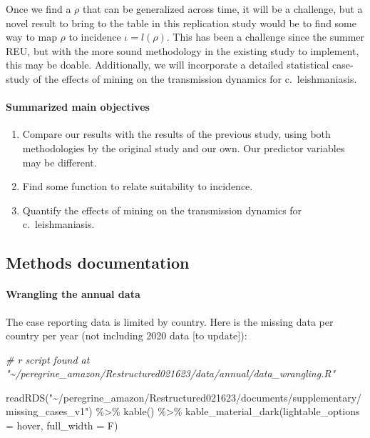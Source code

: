\documentclass[
]{article}
\newenvironment{Shaded}{\begin{snugshade}}{\end{snugshade}}
\newcommand{\AttributeTok}[1]{\textcolor[rgb]{0.77,0.63,0.00}{#1}}
\newcommand{\CommentTok}[1]{\textcolor[rgb]{0.56,0.35,0.01}{\textit{#1}}}
\newcommand{\FunctionTok}[1]{\textcolor[rgb]{0.00,0.00,0.00}{#1}}
\newcommand{\NormalTok}[1]{#1}
\newcommand{\SpecialCharTok}[1]{\textcolor[rgb]{0.00,0.00,0.00}{#1}}
\newcommand{\StringTok}[1]{\textcolor[rgb]{0.31,0.60,0.02}{#1}}
\begin{document}
Once we find a \(\rho\) that can be generalized across time, it will be
a challenge, but a novel result to bring to the table in this
replication study would be to find some way to map \(\rho\) to incidence
\(\iota = l(\rho)\). This has been a challenge since the summer REU, but
with the more sound methodology in the existing study to implement, this
may be doable. Additionally, we will incorporate a detailed statistical
case-study of the effects of mining on the transmission dynamics for
c.~leishmaniasis.

\hypertarget{summarized-main-objectives}{%
\paragraph{Summarized main
objectives}\label{summarized-main-objectives}}

\begin{enumerate}
\def\labelenumi{\arabic{enumi}.}
\item
  Compare our results with the results of the previous study, using both
  methodologies by the original study and our own. Our predictor
  variables may be different.
\item
  Find some function to relate suitability to incidence.
\item
  Quantify the effects of mining on the transmission dynamics for
  c.~leishmaniasis.
\end{enumerate}

\newpage

\hypertarget{methods-documentation}{%
\subsection{Methods documentation}\label{methods-documentation}}

\hypertarget{wrangling-the-annual-data}{%
\paragraph{Wrangling the annual data}\label{wrangling-the-annual-data}}

The case reporting data is limited by country. Here is the missing data
per country per year (not including 2020 data {[}to update{]}):

\begin{Shaded}
\begin{Highlighting}[]
\CommentTok{\# r script found at "\textasciitilde{}/peregrine\_amazon/Restructured021623/data/annual/data\_wrangling.R"}

\FunctionTok{readRDS}\NormalTok{(}\StringTok{"\textasciitilde{}/peregrine\_amazon/Restructured021623/documents/supplementary/missing\_cases\_v1"}\NormalTok{) }\SpecialCharTok{\%\textgreater{}\%} 
  \FunctionTok{kable}\NormalTok{() }\SpecialCharTok{\%\textgreater{}\%} 
  \FunctionTok{kable\_material\_dark}\NormalTok{(}\AttributeTok{lightable\_options =} \StringTok{\textquotesingle{}hover\textquotesingle{}}\NormalTok{,}
                      \AttributeTok{full\_width =}\NormalTok{ F)}
\end{Highlighting}
\end{Shaded}
\end{document}
